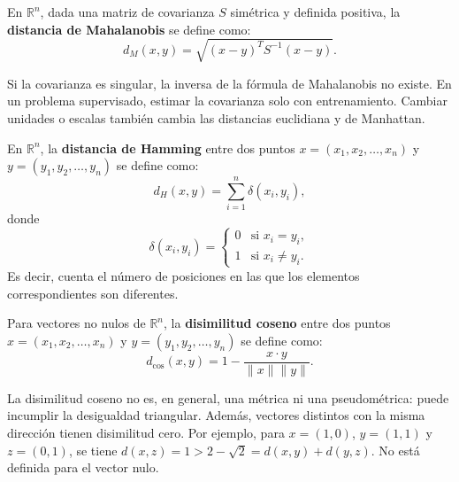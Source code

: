 \documentclass[a4,11pt]{aleph-notas}
\begin{document}
\begin{defi}
    En $\mathbb{R}^n$, dada una matriz de covarianza $S$ simétrica y definida positiva, la \textbf{distancia de Mahalanobis} se define como:
    \[
        d_M(x, y) = \sqrt{(x - y)^T S^{-1} (x - y)}.
    \]
\end{defi}

\begin{advertencia}
    Si la covarianza es singular, la inversa de la fórmula de Mahalanobis no existe. En un problema supervisado, estimar la covarianza solo con entrenamiento. Cambiar unidades o escalas también cambia las distancias euclidiana y de Manhattan.
\end{advertencia}

\begin{defi}[Hamming]
    En $\mathbb{R}^n$, la \textbf{distancia de Hamming} entre dos puntos $x = (x_1, x_2, \dots, x_n)$ y $y = (y_1, y_2, \dots, y_n)$ se define como:
    \[
        d_H(x, y) = \sum_{i=1}^{n} \delta(x_i, y_i),
    \]
    donde
    \[
        \delta(x_i, y_i) =
        \begin{cases}
            0 & \text{si } x_i = y_i, \\
            1 & \text{si } x_i \neq y_i.
        \end{cases}
    \]
    Es decir, cuenta el número de posiciones en las que los elementos correspondientes son diferentes.
\end{defi}

\begin{defi}
    Para vectores no nulos de $\mathbb{R}^n$, la \textbf{disimilitud coseno} entre dos puntos $x = (x_1, x_2, \dots, x_n)$ y $y = (y_1, y_2, \dots, y_n)$ se define como:
    \[
        d_{\cos}(x, y) = 1 - \frac{x \cdot y}{\|x\| \|y\|}.
    \]
\end{defi}

\begin{advertencia}
    La disimilitud coseno no es, en general, una métrica ni una pseudométrica: puede incumplir la desigualdad triangular. Además, vectores distintos con la misma dirección tienen disimilitud cero. Por ejemplo, para $x=(1,0)$, $y=(1,1)$ y $z=(0,1)$, se tiene $d(x,z)=1>2-\sqrt{2}=d(x,y)+d(y,z)$. No está definida para el vector nulo.
\end{advertencia}
\end{document}
